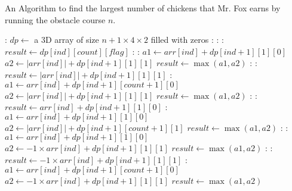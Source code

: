 \documentclass{article}
\begin{document}
\begin{algorithm}
\small %
\caption{An Algorithm to find the largest number of chickens that Mr. Fox earns by running the obstacle course $n$.}
\begin{algorithmic}[1]
    
    :
        \State $dp \gets$ a 3D array of size $n+1 \times 4 \times 2$ filled with zeros
        :
            :
                :
                    \State $result \gets dp[ind][count][flag]$
                    :
                        :
                            \State $a1 \gets arr[ind] + dp[ind + 1][1][0]$
                            \State $a2 \gets |arr[ind]| + dp[ind + 1][1][1]$
                            \State $result \gets \max(a1, a2)$
                        :
                            :
                                \State $result \gets |arr[ind]| + dp[ind + 1][1][1]$
                            \Else:
                                \State $a1 \gets arr[ind] + dp[ind + 1][count + 1][0]$
                                \State $a2 \gets |arr[ind]| + dp[ind + 1][1][1]$
                                \State $result \gets \max(a1, a2)$
                            \EndIf
                        :
                            :
                                \State $result \gets arr[ind] + dp[ind + 1][1][0]$
                            \Else:
                                \State $a1 \gets arr[ind] + dp[ind + 1][1][0]$
                                \State $a2 \gets |arr[ind]| + dp[ind + 1][count + 1][1]$
                                \State $result \gets \max(a1, a2)$
                            \EndIf
                        \EndIf
                    \Else:
                        :
                            \State $a1 \gets arr[ind] + dp[ind + 1][1][0]$
                            \State $a2 \gets -1 \times arr[ind] + dp[ind + 1][1][1]$
                            \State $result \gets \max(a1, a2)$
                        :
                            :
                                \State $result \gets -1 \times arr[ind] + dp[ind + 1][1][1]$
                            \Else:
                                \State $a1 \gets arr[ind] + dp[ind + 1][count + 1][0]$
                                \State $a2 \gets -1 \times arr[ind] + dp[ind + 1][1][1]$
                                \State $result \gets \max(a1, a2)$

\end{algorithmic}
\end{algorithm}
\end{document}
